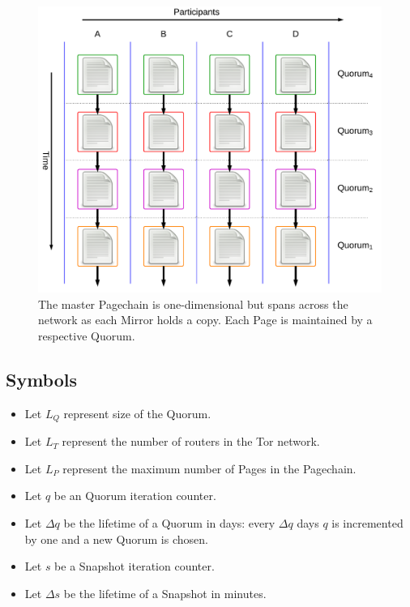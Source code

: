 \documentclass{sig-alternate}
\begin{document}
\begin{figure}[h!]
	\centering
	\includegraphics[width=1\linewidth]{../images/LucidCharts/Data-Structure-Overview.pdf}
	\caption{The master Pagechain is one-dimensional but spans across the network as each Mirror holds a copy. Each Page is maintained by a respective Quorum.}
\end{figure}

\subsection{Symbols} %

\begin{itemize}[noitemsep,nolistsep]
	\item Let $ L_{Q} $ represent size of the Quorum.
	\item Let $ L_{T} $ represent the number of routers in the Tor network.
	\item Let $ L_{P} $ represent the maximum number of Pages in the Pagechain.
	\item Let $ q $ be an Quorum iteration counter.
	\item Let $ \Delta q $ be the lifetime of a Quorum in days: every $ \Delta q $ days $ q $ is incremented by one and a new Quorum is chosen.
	\item Let $ s $ be a Snapshot iteration counter.
	\item Let $ \Delta s $ be the lifetime of a Snapshot in minutes.
\end{itemize}
\end{document}
